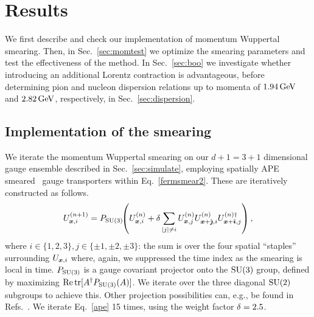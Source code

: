\section{Results}
\label{sec:results}
We first describe and check our implementation
of momentum Wuppertal smearing. 
Then, in Sec.~\ref{sec:momtest} we optimize the smearing parameters
and test the effectiveness of the method. In Sec.~\ref{sec:boo}
we investigate whether introducing an additional Lorentz contraction
is advantageous, before determining pion and nucleon dispersion relations
up to momenta of $1.94\,\textmd{GeV}$ and $2.82\,\textmd{GeV}$, respectively,
in Sec.~\ref{sec:dispersion}.
\subsection{Implementation of the smearing}
We iterate the momentum Wuppertal smearing on our
$d+1=3+1$ dimensional gauge ensemble described in Sec.~\ref{sec:simulate},
employing spatially APE smeared~\cite{Falcioni:1984ei} gauge
transporters within Eq.~\eqref{fermsmear2}. These are iteratively
constructed as follows.
\begin{equation}
\label{ape}
U_{\boldsymbol{x},i}^{(n+1)}= P_{\textmd{SU}(3)}\!\!\left(U_{\boldsymbol{x},i}^{(n)}+\delta\sum_{|j|\neq i}
U_{\boldsymbol{x},j}^{(n)}U^{(n)}_{\boldsymbol{x}+\hat{\boldsymbol{\jmath}},i}U^{(n)\dagger}_{\boldsymbol{x}+\hat{\boldsymbol{\imath}},j}\right),
\end{equation}
where $i\in\{1,2,3\}, j\in\{\pm 1,\pm 2,\pm 3\}$:
the sum is over the four spatial ``staples'' surrounding
$U_{\boldsymbol{x},i}$ where, again, we suppressed the time index as the
smearing is local in time. $P_{\textmd{SU}(3)}$ is a gauge covariant
projector onto the $\textmd{SU}(3)$
group, defined by maximizing $\mathop{\textmd{Re}}\nolimits\mathop{\textmd{tr}}\nolimits[A^{\dagger} P_{\textmd{SU}(3)}(A)]$.
We iterate over the three
diagonal $\textmd{SU}(2)$ subgroups to achieve this. Other
projection possibilities can, e.g., be found in
Refs.~\cite{Morningstar:2003gk,Bali:2005fu}.
We iterate Eq.~\eqref{ape}
15 times, using the weight factor $\delta=2.5$.

